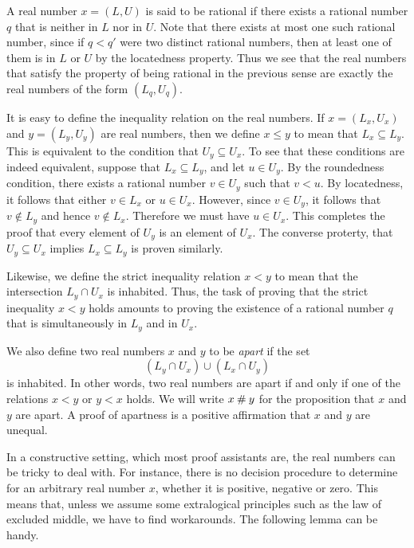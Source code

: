 A real number $x=(L,U)$ is said to be rational if there exists a rational number $q$ that is neither in $L$ nor in $U$. Note that there exists at most one such rational number, since if $q<q'$ were two distinct rational numbers, then at least one of them is in $L$ or $U$ by the locatedness property. Thus we see that the real numbers that satisfy the property of being rational in the previous sense are exactly the real numbers of the form $(L_q,U_q)$.

It is easy to define the inequality relation on the real numbers. If $x=(L_x,U_x)$ and $y=(L_y,U_y)$ are real numbers, then we define $x \leq y$ to mean that $L_x\subseteq L_y$. This is equivalent to the condition that $U_y\subseteq U_x$. To see that these conditions are indeed equivalent, suppose that $L_x\subseteq L_y$, and let $u\in U_y$. By the roundedness condition, there exists a rational number $v\in U_y$ such that $v<u$. By locatedness, it follows that either $v\in L_x$ or $u\in U_x$. However, since $v\in U_y$, it follows that $v\notin L_y$ and hence $v\notin L_x$. Therefore we must have $u\in U_x$. This completes the proof that every element of $U_y$ is an element of $U_x$. The converse proterty, that $U_y\subseteq U_x$ implies $L_x\subseteq L_y$ is proven similarly.

Likewise, we define the strict inequality relation $x<y$ to mean that the intersection $L_y\cap U_x$ is inhabited. Thus, the task of proving that the strict inequality $x<y$ holds amounts to proving the existence of a rational number $q$ that is simultaneously in $L_y$ and in $U_x$.

We also define two real numbers $x$ and $y$ to be \emph{apart} if the set
\begin{equation*}
  (L_y\cap U_x)\cup (L_x\cap U_y)
\end{equation*}
is inhabited. In other words, two real numbers are apart if and only if one of the relations $x<y$ or $y<x$ holds. We will write $x\mathbin{\#} y$ for the proposition that $x$ and $y$ are apart. A proof of apartness is a positive affirmation that $x$ and $y$ are unequal.

In a constructive setting, which most proof assistants are, the real numbers can be tricky to deal with. For instance, there is no decision procedure to determine for an arbitrary real number $x$, whether it is positive, negative or zero. This means that, unless we assume some extralogical principles such as the law of excluded middle, we have to find workarounds. The following lemma can be handy.

